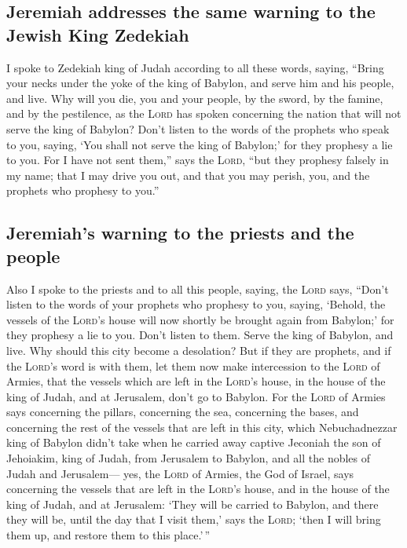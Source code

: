 \hypertarget{jeremiah-addresses-the-same-warning-to-the-jewish-king-zedekiah}{%
\subsection{Jeremiah addresses the same warning to the Jewish King
Zedekiah}\label{jeremiah-addresses-the-same-warning-to-the-jewish-king-zedekiah}}

 I spoke to Zedekiah king of Judah according to all these
words, saying, ``Bring your necks under the yoke of the king of Babylon,
and serve him and his people, and live.  Why will you
die, you and your people, by the sword, by the famine, and by the
pestilence, as the \textsc{Lord} has spoken concerning the nation that
will not serve the king of Babylon?  Don't listen to the
words of the prophets who speak to you, saying, `You shall not serve the
king of Babylon;' for they prophesy a lie to you.  For I
have not sent them,'' says the \textsc{Lord}, ``but they prophesy
falsely in my name; that I may drive you out, and that you may perish,
you, and the prophets who prophesy to you.''

\hypertarget{jeremiahs-warning-to-the-priests-and-the-people}{%
\subsection{Jeremiah's warning to the priests and the
people}\label{jeremiahs-warning-to-the-priests-and-the-people}}

 Also I spoke to the priests and to all this people,
saying, the \textsc{Lord} says, ``Don't listen to the words of your
prophets who prophesy to you, saying, `Behold, the vessels of the
\textsc{Lord}'s house will now shortly be brought again from Babylon;'
for they prophesy a lie to you.  Don't listen to them.
Serve the king of Babylon, and live. Why should this city become a
desolation?  But if they are prophets, and if the
\textsc{Lord}'s word is with them, let them now make intercession to the
\textsc{Lord} of Armies, that the vessels which are left in the
\textsc{Lord}'s house, in the house of the king of Judah, and at
Jerusalem, don't go to Babylon.  For the \textsc{Lord} of
Armies says concerning the pillars, concerning the sea, concerning the
bases, and concerning the rest of the vessels that are left in this
city,  which Nebuchadnezzar king of Babylon didn't take
when he carried away captive Jeconiah the son of Jehoiakim, king of
Judah, from Jerusalem to Babylon, and all the nobles of Judah and
Jerusalem---  yes, the \textsc{Lord} of Armies, the God
of Israel, says concerning the vessels that are left in the
\textsc{Lord}'s house, and in the house of the king of Judah, and at
Jerusalem:  `They will be carried to Babylon, and there
they will be, until the day that I visit them,' says the \textsc{Lord};
`then I will bring them up, and restore them to this place.'\,''


